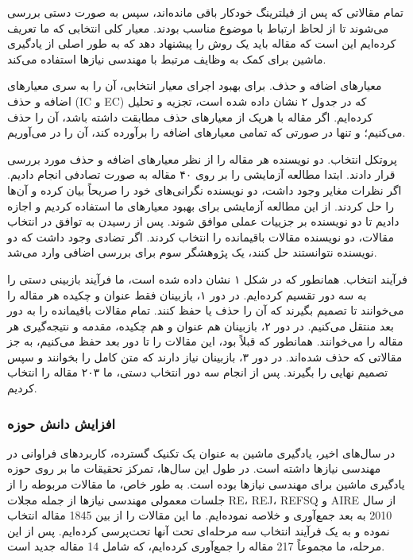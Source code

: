 \documentclass[a4paper,10pt]{article}
\begin{document}
                تمام مقالاتی که پس از فیلترینگ خودکار باقی مانده‌اند، سپس به صورت دستی بررسی می‌شوند تا از لحاظ ارتباط با موضوع مناسب بودند. معیار کلی انتخابی که ما تعریف کرده‌ایم این است که مقاله باید یک روش را پیشنهاد دهد که به طور اصلی از یادگیری ماشین برای کمک به وظایف مرتبط با مهندسی نیازها استفاده می‌کند.

                معیارهای اضافه و حذف. برای بهبود اجرای معیار انتخابی، آن را به سری معیارهای اضافه و حذف (IC و EC) که در جدول ۲ نشان داده شده است، تجزیه و تحلیل کرده‌ایم. اگر مقاله با هریک از معیارهای حذف مطابقت داشته باشد، آن را حذف می‌کنیم؛ و تنها در صورتی که تمامی معیارهای اضافه را برآورده کند، آن را در می‌آوریم.
                
                پروتکل انتخاب. دو نویسنده هر مقاله را از نظر معیارهای اضافه و حذف مورد بررسی قرار دادند. ابتدا مطالعه آزمایشی را بر روی ۴۰ مقاله به صورت تصادفی انجام دادیم. اگر نظرات مغایر وجود داشت، دو نویسنده نگرانی‌های خود را صریحاً بیان کرده و آن‌ها را حل کردند. از این مطالعه آزمایشی برای بهبود معیارهای ما استفاده کردیم و اجازه دادیم تا دو نویسنده بر جزییات عملی موافق شوند. پس از رسیدن به توافق در انتخاب مقالات، دو نویسنده مقالات باقیمانده را انتخاب کردند. اگر تضادی وجود داشت که دو نویسنده نتوانستند حل کنند، یک پژوهشگر سوم برای بررسی اضافی وارد می‌شد.
                
                فرآیند انتخاب. همانطور که در شکل ۱ نشان داده شده است، ما فرآیند بازبینی دستی را به سه دور تقسیم کرده‌ایم. در دور ۱، بازبینان فقط عنوان و چکیده هر مقاله را می‌خوانند تا تصمیم بگیرند که آن را حذف یا حفظ کنند. تمام مقالات باقیمانده را به دور بعد منتقل می‌کنیم. در دور ۲، بازبینان هم عنوان و هم چکیده، مقدمه و نتیجه‌گیری هر مقاله را می‌خوانند. همانطور که قبلاً بود، این مقالات را تا دور بعد حفظ می‌کنیم، به جز مقالاتی که حذف شده‌اند. در دور ۳، بازبینان نیاز دارند که متن کامل را بخوانند و سپس تصمیم نهایی را بگیرند. پس از انجام سه دور انتخاب دستی، ما ۲۰۳ مقاله را انتخاب کردیم.
            
            \subsubsection{افزایش دانش حوزه}

                در سال‌های اخیر، یادگیری ماشین به عنوان یک تکنیک گسترده، کاربردهای فراوانی در مهندسی نیازها داشته است. در طول این سال‌ها، تمرکز تحقیقات ما بر روی حوزه یادگیری ماشین برای مهندسی نیازها بوده است. به طور خاص، ما مقالات مربوطه را از جلسات معمولی مهندسی نیازها از جمله مجلات RE، REJ، REFSQ و AIRE از سال 2010 به بعد جمع‌آوری و خلاصه نموده‌ایم. ما این مقالات را از بین 1845 مقاله انتخاب نموده و به یک فرآیند انتخاب سه مرحله‌ای تحت آنها تحت‌پرسی کرده‌ایم. پس از این مرحله، ما مجموعاً 217 مقاله را جمع‌آوری کرده‌ایم، که شامل 14 مقاله جدید است.
\end{document}

